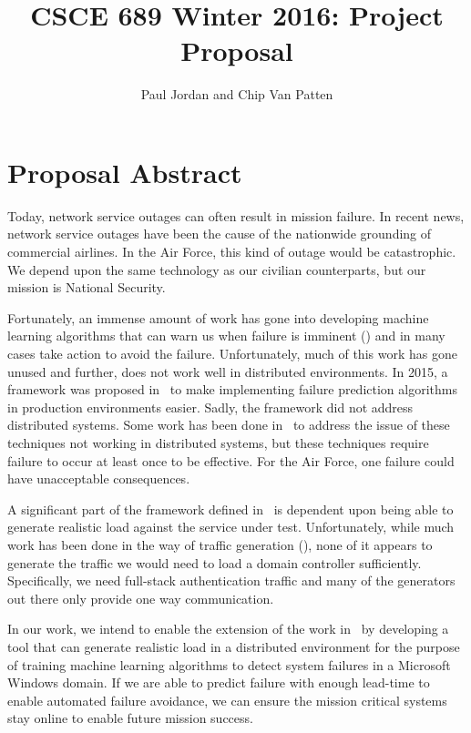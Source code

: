\documentclass{article}
\title{CSCE 689 Winter 2016: Project Proposal}
\author{Paul Jordan and Chip Van Patten}
\begin{document}
\maketitle
\section{Proposal Abstract}
Today, network service outages can often result in mission failure.  In recent
news, network service outages have been the cause of the nationwide grounding
of commercial airlines.  In the Air Force, this kind of outage would be
catastrophic.  We depend upon the same technology as our civilian counterparts,
but our mission is National Security.  

Fortunately, an immense amount of work has gone into developing machine
learning algorithms that can warn us when failure is imminent
(\cite{salfnerSurvey,irrera2015,irrera2014,watanabe2014}) and in many cases
take action to avoid the failure.  Unfortunately, much of this work has gone
unused and further, does not work well in distributed environments.  In 2015, a
framework was proposed in~\cite{irrera2015} to make implementing failure
prediction algorithms in production environments easier.  Sadly, the framework
did not address distributed systems.  Some work has been done
in~\cite{watanabe2014,watanabe2012,sonoda2012} to address the issue of these
techniques not working in distributed systems, but these techniques require
failure to occur at least once to be effective.  For the Air Force, one failure
could have unacceptable consequences.

A significant part of the framework defined in~\cite{irrera2015} is dependent
upon being able to generate realistic load against the service under test.
Unfortunately, while much work has been done in the way of traffic generation
(\cite{avallone2004, antichi2008, molnar2013, vishwanath2009, albrecht2009,
zach2013}), none of it appears to generate the traffic we would need to load a
domain controller sufficiently.  Specifically, we need full-stack
authentication traffic and many of the generators out there only provide one
way communication.  

In our work, we intend to enable the extension of the work in~\cite{irrera2015}
by developing a tool that can generate realistic load in a distributed
environment for the purpose of training machine learning algorithms to detect
system failures in a Microsoft Windows domain.  If we are able to predict
failure with enough lead-time to enable automated failure avoidance, we can
ensure the mission critical systems stay online to enable future mission
success.
\end{document}
